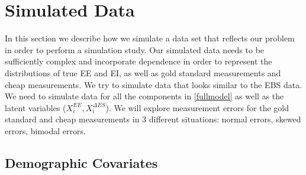 \documentclass[11pt]{article}\usepackage[]{graphicx}\usepackage[]{color}
\begin{document}
% 
% 


\section{Simulated Data}

In this section we describe how we simulate a data set that reflects our problem in order to perform a simulation study. Our simulated data needs to be sufficiently complex and incorporate dependence in order to represent the distributions of true EE and EI, as well as gold standard measurements and cheap measurements. We try to simulate data  that looks similar to the EBS data. We need to simulate data for all the components in \eqref{fullmodel} as well as the latent variables ($X_i^{EE}, X_i^{\Delta ES}$). We will explore measurement errors for the gold standard and cheap measurements in 3 different situations: normal errors, skewed errors, bimodal errors. 

\subsection{Demographic Covariates}
\end{document}
